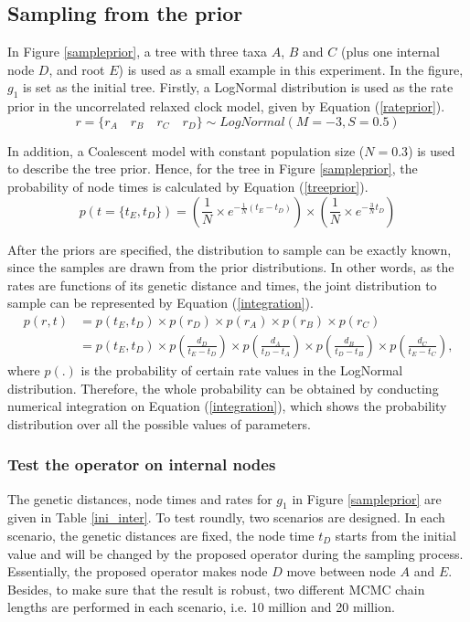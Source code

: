 \documentclass{bmcart}
\begin{document}
\begin{backmatter}
\subsection{Sampling from the prior}
In Figure \ref{sampleprior}, a tree with three taxa $A$, $B$ and $C$ (plus one internal node $D$, and root $E$) is used as a small example in this experiment. In the figure, $g_1$ is set as the initial tree. Firstly, a LogNormal distribution is used as the rate prior in the uncorrelated relaxed clock model, given by Equation (\ref{rateprior}).
\begin{equation}\label{rateprior}
r = \{{r_A}\quad{r_B}\quad{r_C}\quad{r_D}\} \sim LogNormal(M = -3, S = 0.5)
\end{equation}

In addition, a Coalescent model \cite{pybus2002genie} with constant population size ($N=0.3$) is used to describe the tree prior. Hence, for the tree in Figure \ref{sampleprior}, the probability of node times is calculated by Equation (\ref{treeprior}).
\begin{equation}\label{treeprior}
p(t=\{{t_E},{t_D}\}) = (\frac{1}{N} \times {e^{ - \frac{1}{N}({t_E} - {t_D})}}) \times (\frac{1}{N} \times {e^{ - \frac{3}{N}{t_D}}})
\end{equation}

After the priors are specified, the distribution to sample can be exactly known, since the samples are drawn from the prior distributions. In other words, as the rates are functions of its genetic distance and times, the joint distribution to sample can be represented by Equation (\ref{integration}).
\begin{equation}\label{integration}
\begin{aligned}
p(r,t) &= p({t_E},{t_D}) \times p({r_D}) \times p({r_A}) \times p({r_B}) \times p({r_C}) \\&= p({t_E},{t_D}) \times p(\frac{{{d_D}}}{{t_E} - {t_D}}) \times p(\frac{{{d_A}}}{{t_D} - {t_A}}) \times p(\frac{{{d_B}}}{{t_D} - {t_B}}) \times p(\frac{{{d_C}}}{{t_E} - {t_C}})\text{,}
\end{aligned}
\end{equation}
where $p({.})$ is the probability of certain rate values in the LogNormal distribution. Therefore, the whole probability can be obtained by conducting numerical integration on Equation (\ref{integration}), which shows the probability distribution over all the possible values of parameters.
\subsubsection*{Test the operator on internal nodes}
The genetic distances, node times and rates for $g_1$ in Figure \ref{sampleprior} are given in Table \ref{ini_inter}. To test roundly, two scenarios are designed. In each scenario, the genetic distances are fixed, the node time $t_D$ starts from the initial value and will be changed by the proposed operator during the sampling process. Essentially, the proposed operator makes node $D$ move between node $A$ and $E$. Besides, to make sure that the result is robust, two different MCMC chain lengths are performed in each scenario, i.e. 10 million and 20 million.


\end{backmatter}
\end{document}
